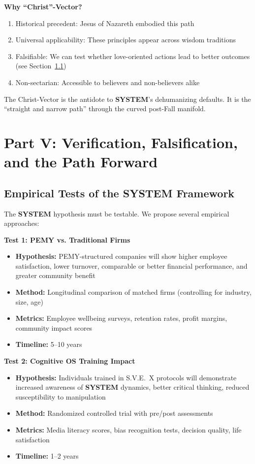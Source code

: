 \documentclass[11pt,a4paper]{article}
\newcommand{\SYSTEM}{\textbf{SYSTEM}}
\theoremstyle{definition}
\theoremstyle{remark}
\begin{document}
\textbf{Why ``Christ''-Vector?}
\begin{enumerate}
    \item Historical precedent: Jesus of Nazareth embodied this path
    \item Universal applicability: These principles appear across wisdom traditions
    \item Falsifiable: We can test whether love-oriented actions lead to better outcomes (see Section~\ref{sec:empirical_tests})
    \item Non-sectarian: Accessible to believers and non-believers alike
\end{enumerate}

The Christ-Vector is the antidote to \SYSTEM{}'s dehumanizing defaults. It is the ``straight and narrow path'' through the curved post-Fall manifold.

\newpage

\section{Part V: Verification, Falsification, and the Path Forward}

\subsection{Empirical Tests of the \SYSTEM{} Framework}
\label{sec:empirical_tests}

The \SYSTEM{} hypothesis must be testable. We propose several empirical approaches:

\textbf{Test 1: PEMY vs. Traditional Firms}
\begin{itemize}
    \item \textbf{Hypothesis:} PEMY-structured companies will show higher employee satisfaction, lower turnover, comparable or better financial performance, and greater community benefit
    \item \textbf{Method:} Longitudinal comparison of matched firms (controlling for industry, size, age)
    \item \textbf{Metrics:} Employee wellbeing surveys, retention rates, profit margins, community impact scores
    \item \textbf{Timeline:} 5--10 years
\end{itemize}

\textbf{Test 2: Cognitive OS Training Impact}
\begin{itemize}
    \item \textbf{Hypothesis:} Individuals trained in S.V.E.~X protocols will demonstrate increased awareness of \SYSTEM{} dynamics, better critical thinking, reduced susceptibility to manipulation
    \item \textbf{Method:} Randomized controlled trial with pre/post assessments
    \item \textbf{Metrics:} Media literacy scores, bias recognition tests, decision quality, life satisfaction
    \item \textbf{Timeline:} 1--2 years
\end{itemize}
\end{document}

